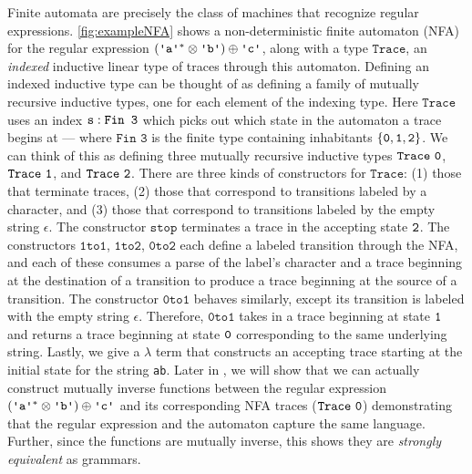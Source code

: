 \documentclass[acmsmall,nonacm]{acmart}
\newcommand{\Trace}{\texttt{Trace}}
\newcommand{\literal}[1]{\texttt{\textquotesingle#1\textquotesingle}}
\newcommand{\stringquote}[1]{\texttt{\textquotedbl#1\textquotedbl}}
\begin{document}
Finite automata are precisely the class of machines that recognize regular
expressions. \cref{fig:exampleNFA} shows a non-deterministic
finite automaton (NFA) for the regular expression
$({\literal a}^{*} \otimes \literal b) \oplus \literal c$, along with a type $\Trace$, an \emph{indexed} inductive linear type of traces through this automaton. Defining an indexed inductive type can be thought
of as defining a family of mutually recursive inductive types, one for each element of the indexing type. Here $\Trace$
uses an index $\texttt{s} : \texttt{Fin 3}$ which picks out which
state in the automaton a trace begins at --- where $\texttt{Fin 3}$ is the
finite type containing inhabitants $\{\texttt{0} , \texttt{1} , \texttt{2}\}$. We can think of this as defining three mutually recursive inductive types $\Trace~\0$,
$\Trace~\1$, and $\Trace~\2$.
%
There are three kinds of constructors for $\Trace$: (1) those that
terminate traces, (2) those that correspond to transitions labeled by
a character, and (3) those that correspond to transitions labeled by
the empty string $\epsilon$. The constructor $\texttt{stop}$
terminates a trace in the accepting state $\texttt{2}$. The constructors
$\texttt{1to1}$, $\texttt{1to2}$, $\texttt{0to2}$ each define a
labeled transition through the NFA, and each of these consumes a parse
of the label's character and a trace beginning at the destination of a
transition to produce a trace beginning at the source of a
transition. The constructor $\texttt{0to1}$ behaves similarly, except
its transition is labeled with the empty string $\epsilon$. Therefore,
$\texttt{0to1}$ takes in a trace beginning at state $\texttt{1}$ and returns a
trace beginning at state $\texttt{0}$ corresponding to the same underlying
string.
%
Lastly, we give a $\lambda$ term that constructs an accepting trace
starting at the initial state for the string \stringquote{ab}.  Later
in , we will show that we can actually
construct mutually inverse functions between the regular expression
$({\literal a}^{*} \otimes \literal b) \oplus \literal c$ and its
corresponding NFA traces ($\Trace~\0$) demonstrating that the regular
expression and the automaton capture the same language. Further, since
the functions are mutually inverse, this shows they are \emph{strongly
equivalent} as grammars.
\end{document}
